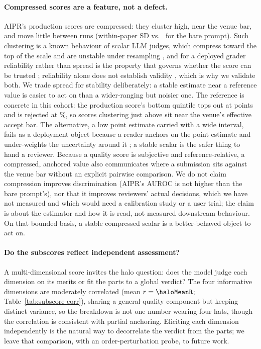 \paragraph{Compressed scores are a feature, not a defect.}
AIPR's production scores are compressed: they cluster high, near the venue bar, and move
little between runs (within-paper SD \fullRunSD{} vs.\ \naiveRunSD{} for the bare prompt).
Such clustering is a known behaviour of scalar LLM judges, which compress toward the top
of the scale and are unstable under resampling \citep{girrbach2025referencefree}, and for
a deployed grader reliability rather than spread is the property that governs whether the
score can be trusted \citep{gu2024surveyllmjudge,schroeder2024trustllm}; reliability alone does
not establish validity \citep{norman2026reliability}, which is why we validate both. We trade spread
for stability deliberately: a stable estimate near a reference value is easier to act on
than a wider-ranging but noisier one. The reference is concrete in this cohort: the
production score's bottom quintile tops out at \bottomBandHiFrontier{} points and is
rejected at \bottomRejectRateFrontier\%, so scores clustering just above
\bottomBandHiFrontier{} sit near the venue's effective accept bar. The alternative, a
low point estimate carried with a wide interval, fails as a deployment object because a
reader anchors on the point estimate and under-weights the uncertainty around it
\citep{hofman2020inferential}; a stable scalar is the safer thing to hand a reviewer.
Because a quality score is subjective and reference-relative, a compressed, anchored value
also communicates where a submission sits against the venue bar without an explicit
pairwise comparison. We do not claim compression improves discrimination (AIPR's AUROC is
not higher than the bare prompt's), nor that it improves reviewers' actual decisions,
which we have not measured and which would need a calibration study or a user trial; the
claim is about the estimator and how it is read, not measured downstream behaviour. On
that bounded basis, a stable compressed scalar is a better-behaved object to act on.

\paragraph{Do the subscores reflect independent assessment?}
A multi-dimensional score invites the halo question: does the model judge each dimension
on its merits or fit the parts to a global verdict? The four informative dimensions are
moderately correlated (mean $r=\haloMeanR$; Table~\ref{tab:subscore-corr}), sharing a
general-quality component but keeping distinct variance, so the breakdown is not one
number wearing four hats, though the correlation is consistent with partial anchoring.
Eliciting each dimension independently is the natural way to decorrelate the verdict from
the parts; we leave that comparison, with an order-perturbation probe, to future work.

